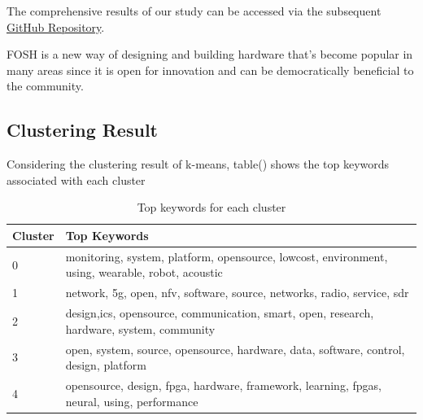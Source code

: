 \documentclass[final-report.tex]{subfiles}
\begin{document}
The comprehensive results of our study can be accessed via the subsequent
\href{https://github.com/aliraeisdanaei/FOSH_Lit_Review}{GitHub Repository}.


FOSH is a new way of designing and building hardware that's become popular in many areas since it is open for innovation and can be democratically beneficial to the community. 
\subsection{Clustering Result}
Considering the clustering result of k-means, table() shows the top keywords associated with each cluster


\begin{table}[h!]
\centering
\begin{tabularx}{0.9\linewidth}{@{}lX@{}}
\toprule
Cluster & Top Keywords \\ \midrule
0       & monitoring, system, platform, opensource, lowcost, environment, using, wearable, robot, acoustic \\
1       & network, 5g, open, nfv, software, source, networks, radio, service, sdr \\
2       & design,ics, opensource, communication, smart, open, research, hardware, system, community \\
3       & open, system, source, opensource, hardware, data, software, control, design, platform \\
4       & opensource, design, fpga, hardware, framework, learning, fpgas, neural, using, performance \\ \bottomrule
\end{tabularx}
\caption{Top keywords for each cluster}
\label{tab:cluster_keywords}
\end{table}
\end{document}

